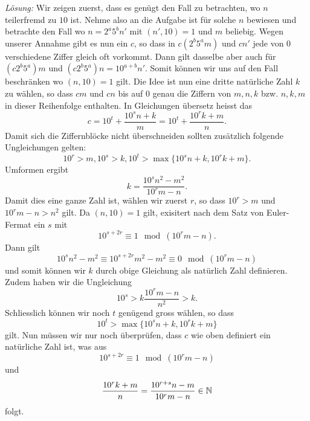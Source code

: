 \documentclass[language=german,style=solution]{smo}
\begin{document}
\begin{enumerate}
\textit{Lösung:}
Wir zeigen zuerst, dass es genügt den Fall zu betrachten, wo $n$ teilerfremd zu $10$ ist. Nehme also an die Aufgabe ist für solche $n$ bewiesen und betrachte den Fall wo $n=2^a5^bn'$ mit $(n',10)=1$ und $m$ beliebig. Wegen unserer Annahme gibt es nun ein $c$, so dass in $c(2^b5^am)$ und $cn'$ jede von $0$ verschiedene Ziffer gleich oft vorkommt. Dann gilt dasselbe aber auch für $(c2^b5^a)m$ und $(c2^b5^a)n=10^{a+b}n'$. 
Somit können wir uns auf den Fall beschränken wo $(n,10)=1$ gilt.
Die Idee ist nun eine dritte natürliche Zahl $k$ zu wählen, so dass $cm$ und $cn$ bis auf $0$ genau die Ziffern von $m,n,k$ bzw. $n,k,m$ in dieser Reihenfolge enthalten. In Gleichungen übersetz heisst das
\[
c= 10^t + \frac{10^sn+k}{m} = 10^t + \frac{10^rk+m}{n}.
\]
Damit sich die Ziffernblöcke nicht überschneiden sollten zusätzlich folgende Ungleichungen gelten:
\[
10^r >m, 10^s>k, 10^t>\max\{10^sn+k,10^rk+m\}.
\]
Umformen ergibt 
\[
k=\frac{10^sn^2-m^2}{10^rm-n}.
\]
Damit dies eine ganze Zahl ist, wählen wir zuerst $r$, so dass $10^r>m$ und $10^rm-n>n^2$ gilt. Da $(n,10)=1$ gilt, exisitert nach dem Satz von Euler-Fermat ein $s$ mit
\[
10^{s+2r} \equiv 1 \mod(10^rm-n).
\]
Dann gilt
\[
10^sn^2-m^2\equiv 10^{s+2r}m^2-m^2 \equiv 0 \mod(10^rm-n)
\]
und somit können wir $k$ durch obige Gleichung als natürlich Zahl definieren. Zudem haben wir die Ungleichung
\[
10^s > k \frac{10^rm-n}{n^2} > k.
\]
Schliesslich können wir noch $t$ genügend gross wählen, so dass 
\[
10^t>\max\{10^sn+k,10^rk+m\}
\]
gilt. Nun müssen wir nur noch überprüfen, dass $c$ wie oben definiert ein natürliche Zahl ist, was aus
\[
10^{s+2r} \equiv 1\mod(10^rm-n)
\]
und 
\[
\frac{10^rk+m}{n} = \frac{10^{r+s}n-m}{10^rm-n}\in \mathbb{N}
\]
folgt.

\end{enumerate}
\end{document}
